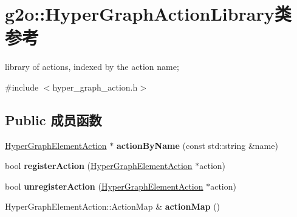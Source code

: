 \hypertarget{classg2o_1_1HyperGraphActionLibrary}{\section{g2o\-:\-:Hyper\-Graph\-Action\-Library类 参考}
\label{classg2o_1_1HyperGraphActionLibrary}
}


library of actions, indexed by the action name;  




{\ttfamily \#include $<$hyper\-\_\-graph\-\_\-action.\-h$>$}

\subsection*{Public 成员函数}
\begin{DoxyCompactItemize}
\item 
\hypertarget{classg2o_1_1HyperGraphActionLibrary_abef8ce416dd53f2d4e8d8566abf4a00f}{\hyperlink{classg2o_1_1HyperGraphElementAction}{Hyper\-Graph\-Element\-Action} $\ast$ {\bfseries action\-By\-Name} (const std\-::string \&name)}\label{classg2o_1_1HyperGraphActionLibrary_abef8ce416dd53f2d4e8d8566abf4a00f}

\item 
\hypertarget{classg2o_1_1HyperGraphActionLibrary_a8ff09559af9efdf636ad14a011ef73ae}{bool {\bfseries register\-Action} (\hyperlink{classg2o_1_1HyperGraphElementAction}{Hyper\-Graph\-Element\-Action} $\ast$action)}\label{classg2o_1_1HyperGraphActionLibrary_a8ff09559af9efdf636ad14a011ef73ae}

\item 
\hypertarget{classg2o_1_1HyperGraphActionLibrary_abe4c076e6734ffa79f6d2bff07f9fad5}{bool {\bfseries unregister\-Action} (\hyperlink{classg2o_1_1HyperGraphElementAction}{Hyper\-Graph\-Element\-Action} $\ast$action)}\label{classg2o_1_1HyperGraphActionLibrary_abe4c076e6734ffa79f6d2bff07f9fad5}

\item 
\hypertarget{classg2o_1_1HyperGraphActionLibrary_a99d123d19dda08f30ab0088d361fc640}{Hyper\-Graph\-Element\-Action\-::\-Action\-Map \& {\bfseries action\-Map} ()}\label{classg2o_1_1HyperGraphActionLibrary_a99d123d19dda08f30ab0088d361fc640}

\end{DoxyCompactItemize}
